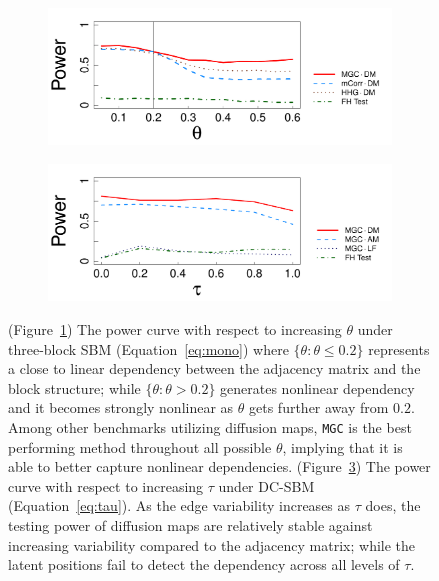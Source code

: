 \documentclass[11pt]{article}
\theoremstyle{definition}
\begin{document}
\begin{figure}[!ht]
	\centering
	\begin{subfigure}[b]{0.7\textwidth}
		\includegraphics[width=\textwidth]{../Figure/monoelbow3_t3.pdf}
		\caption{} 
		\label{fig:powerplot}
	\end{subfigure}
	\begin{subfigure}[b]{0.7\textwidth}
		\includegraphics[width=\textwidth]{../Figure/elbow3_dcSBM.pdf}
		\caption{} 
		\label{fig:tau}
	\end{subfigure}
	\caption{ (Figure~\ref{fig:powerplot}) The power curve with respect to increasing $\theta$ under three-block SBM (Equation~\ref{eq:mono}) where $\{\theta : \theta \leq 0.2 \}$ represents a close to linear dependency between the adjacency matrix and the block structure; while $\{ \theta : \theta > 0.2 \}$ generates nonlinear dependency and it becomes strongly nonlinear as $\theta$ gets further away from $0.2$. Among other benchmarks utilizing diffusion maps, \texttt{MGC} is the best performing method throughout all possible $\theta$, implying that it is able to better capture nonlinear dependencies. (Figure~\ref{fig:tau}) The power curve with respect to increasing $\tau$ under DC-SBM (Equation~\ref{eq:tau}). As the edge variability increases as $\tau$ does, the testing power of diffusion maps are relatively stable against increasing variability compared to the adjacency matrix; while the latent positions fail to detect the dependency across all levels of $\tau$.} 
\end{figure}
\end{document}
